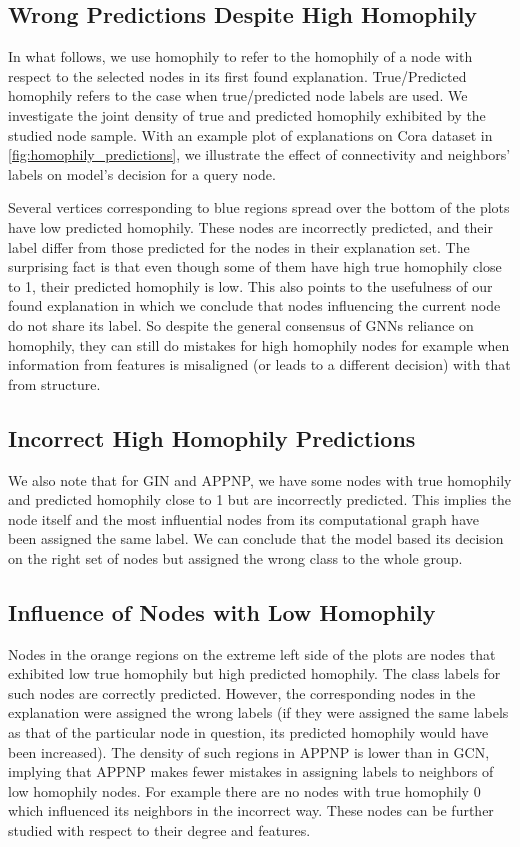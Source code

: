 \subsection{Wrong Predictions Despite High Homophily} 
In what follows, we use homophily to refer to the homophily of a node with respect to the selected nodes in its first found explanation. True/Predicted homophily refers to the case when true/predicted node labels are used.
We investigate the joint density of true and predicted homophily exhibited by the studied node sample. 
With an example plot of explanations on Cora dataset in \ref{fig:homophily_predictions}, we illustrate the effect of connectivity and neighbors' labels on model's decision for a query node.

Several vertices corresponding to blue regions spread over the bottom of the plots have low predicted homophily. These nodes are incorrectly predicted, and their label differ from those predicted for the nodes in their explanation set. The surprising fact is that even though some of them have high true homophily close to 1, their predicted homophily is low. This also points to the usefulness of our found explanation in which we conclude that nodes influencing the current node do not share its label. So despite the general consensus of GNNs reliance on homophily, they can still do mistakes for high homophily nodes for example when information from features is misaligned (or leads to a different decision) with that from structure.

\subsection{Incorrect High Homophily Predictions} We also note that for GIN and APPNP, we have some nodes with true homophily and predicted homophily close to 1 but are incorrectly predicted. This implies the node itself and the most influential nodes from its computational graph have been assigned the same label. We can conclude that the model based its decision on the right set of nodes but assigned the wrong class to the whole group. 

\subsection{Influence of Nodes with Low Homophily}
 Nodes in the orange regions on the extreme left side of the plots are nodes that exhibited low true homophily but high predicted homophily. The class labels for such nodes are correctly predicted. However, the corresponding nodes in the explanation were assigned the wrong labels (if they were assigned the same labels as that of the particular node in question, its predicted homophily would have been increased). The density of such regions in APPNP is lower than in GCN, implying that APPNP makes fewer mistakes in assigning labels to neighbors of low homophily nodes. For example there are no nodes with true homophily $0$ which influenced its neighbors in the incorrect way. These nodes can be further studied with respect to their degree and features. 

